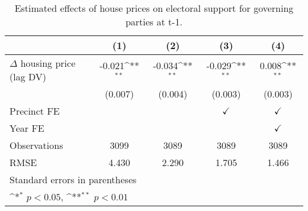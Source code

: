 \begin{table}[htbp]\centering
\def\sym#1{\ifmmode^{#1}\else\(^{#1}\)\fi}
\caption{Estimated effects of house prices on electoral support for governing parties at t-1.} \label{prelagdv}
\begin{tabular}{l*{4}{c}}
\hline\hline
                    &\multicolumn{1}{c}{(1)}        &\multicolumn{1}{c}{(2)}        &\multicolumn{1}{c}{(3)}        &\multicolumn{1}{c}{(4)}        \\
\hline
$\Delta$ housing price (lag DV)&      -0.021\sym{**}&      -0.034\sym{**}&      -0.029\sym{**}&       0.008\sym{**}\\
                    &     (0.007)        &     (0.004)        &     (0.003)        &     (0.003)        \\
[1em]
\hline Precinct FE  &                    &                    &$\checkmark$        &$\checkmark$        \\
[1em]
Year FE             &                    &                    &                    &$\checkmark$        \\
\hline
Observations        &        3099        &        3089        &        3089        &        3089        \\
RMSE                &       4.430        &       2.290        &       1.705        &       1.466        \\
\hline\hline
\multicolumn{5}{l}{\footnotesize Standard errors in parentheses}\\
\multicolumn{5}{l}{\footnotesize \sym{*} \(p<0.05\), \sym{**} \(p<0.01\)}\\
\end{tabular}
\end{table}
